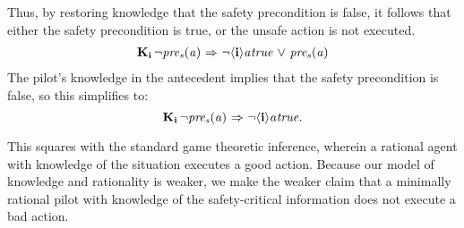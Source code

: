 Thus, by restoring knowledge that the safety precondition is false, it follows that either the safety precondition is true, or the unsafe action is not executed. 
\begin{eqnarray}
\mathbf{K}_{\mathbf{i}}\,{\neg} \mathit{pre_s}(\mathit{a}) {\ \Rightarrow \ } {\neg} \mathbf{\langle i\rangle}{\mathit{a}}\mathit{true} {\ \vee \ } \mathit{pre_s}(\mathit{a})
\end{eqnarray}
The pilot's knowledge in the antecedent implies that the safety precondition is false, so this simplifies to:
\begin{equation}
\mathbf{K}_{\mathbf{i}}\,{\neg} \mathit{pre_s}(\mathit{a}) {\ \Rightarrow \ } {\neg} \mathbf{\langle i\rangle}{\mathit{a}}\mathit{true}.
\end{equation}

This squares with the standard game theoretic inference, wherein a rational agent with knowledge of the situation executes a good action. Because our model of knowledge and rationality is weaker, we make the weaker claim that a minimally rational pilot with knowledge of the safety-critical information does not execute a bad action.


